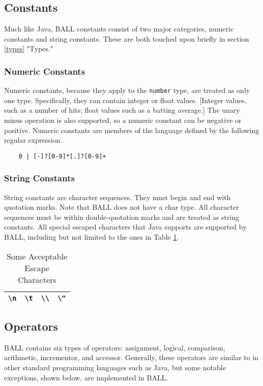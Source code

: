 \subsection{Constants}
Much like Java, BALL constants consist of two major categories, numeric constants and string constants. These are both touched upon briefly in section \ref{types} "Types."
\subsubsection{Numeric Constants}
Numeric constants, because they apply to the \texttt{number} type, are treated as only one type. Specifically, they can contain integer or float values. [Integer values, such as a number of hits; float values such as a batting average.] The unary minus operation is also supported, so a numeric constant can be negative or positive. Numeric constants are members of the language defined by the following regular expression. 
\begin{verbatim}
    0 | [-]?[0-9]*[.]?[0-9]+
\end{verbatim}

\subsubsection{String Constants}
String constants are character sequences. They must begin and end with quotation marks. Note that BALL does not have a char type. All character sequences must be within double-quotation marks and are treated as string constants. All special escaped characters that Java supports are supported by BALL, including but not limited to the ones in Table \ref{escape}.
\begin{table}[htdp]
\begin{center}
\begin{tabular}{|c|c|c|c|}
\hline
\texttt{\textbackslash n} & \texttt{\textbackslash t} & \texttt{\textbackslash \textbackslash} & \texttt{\textbackslash "}\\
\hline
\end{tabular}
\caption{Some Acceptable Escape Characters}\label{escape}
\end{center}
\end{table}%

\subsection{Operators}
BALL contains six types of operators: assignment, logical, comparison, arithmetic, incrementor, and accessor. Generally, these operators are similar to in other standard programming languages such as Java, but some notable exceptions, shown below, are implemented in BALL.

